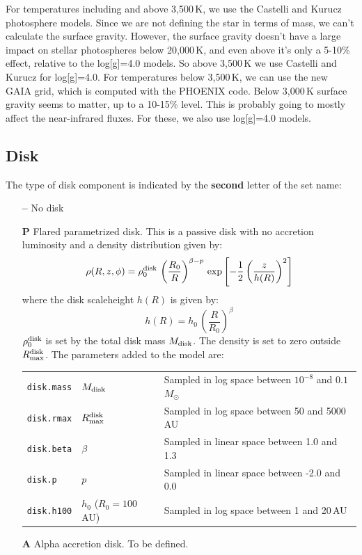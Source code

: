 \documentclass[10pt]{article}
\newcommand{\mdisk}{M_{\rm disk}}
\newcommand{\msun}{M_\odot}
\newcommand{\rmaxd}{R^{\rm disk}_{\rm max}}
\begin{document}
\begin{itemize}
For temperatures including and above 3,500\,K, we use the Castelli and Kurucz photosphere models. Since we are not defining the star in terms of mass, we can't calculate the surface gravity. However, the surface gravity doesn't have a large impact on stellar photospheres below 20,000\,K, and even above it's only a 5-10\% effect, relative to the log[g]=4.0 models. So above 3,500\,K we use Castelli and Kurucz for log[g]=4.0. For temperatures below 3,500\,K, we can use the new GAIA grid, which is computed with the PHOENIX code. Below 3,000\,K surface gravity seems to matter, up to a 10-15\% level. This is probably going to mostly affect the near-infrared fluxes. For these, we also use log[g]=4.0 models.

\end{itemize}
         
\subsection{Disk}

The type of disk component is indicated by the \textbf{second} letter of the set name:

\begin{itemize}

\item[\textbf{--}] No disk

\item[\textbf{P}] Flared parametrized disk. This is a passive disk with no accretion luminosity and a density distribution given by:
$$
\rho(R,z,\phi) = \rho_0^{\rm disk}\,\left(\frac{R_0}{R}\right)^{\beta - p}\,\exp{\left[-\frac{1}{2}\left(\frac{z}{h(R)}\right)^2\right]}
$$
where the disk scaleheight $h(R)$ is given by:
$$
h(R) = h_0\,\left(\frac{R}{R_0}\right)^\beta
$$
$\rho_0^{\rm disk}$ is set by the total disk mass $M_{\rm disk}$. The density is set to zero outside $\rmaxd$. The parameters added to the model are:

\begin{center}
  \begin{tabular}{llp{4in}}
    \texttt{disk.mass} & $\mdisk$ & Sampled in log space between $10^{-8}$ and $0.1$\,$\msun$ \\
    \texttt{disk.rmax} & $\rmaxd$ & Sampled in log space between 50 and 5000\,AU \\
    \texttt{disk.beta} & $\beta$ & Sampled in linear space between 1.0 and 1.3 \\
    \texttt{disk.p} & $p$ & Sampled in linear space between -2.0 and 0.0 \\
    \texttt{disk.h100} & $h_0$ ($R_0=100$\,AU) & Sampled in log space between 1 and 20\,AU \\
  \end{tabular}
\end{center}

\item[\textbf{A}] Alpha accretion disk. To be defined.

\end{itemize}
\end{document}
